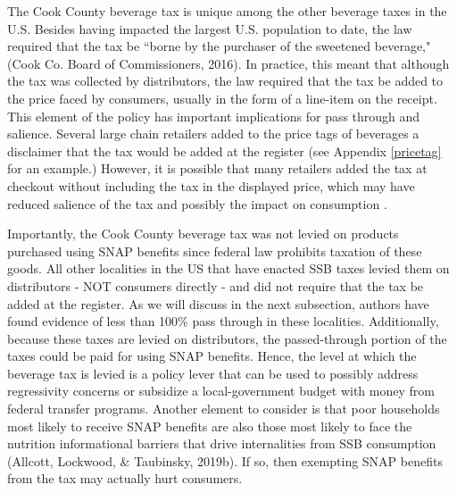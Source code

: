 \documentclass[12pt]{article}
\begin{document}
The Cook County beverage tax is unique among the other beverage taxes in the U.S. Besides having impacted the largest U.S. population to date, the law required that the tax be ``borne by the purchaser of the sweetened beverage," (Cook Co. Board of Commissioners, 2016). In practice, this meant that although the tax was collected by distributors, the law required that the tax be added to the price faced by consumers, usually in the form of a line-item on the receipt. This element of the policy has important implications for pass through and salience. Several large chain retailers added to the price tags of beverages a disclaimer that the tax would be added at the register (see Appendix \ref{pricetag} for an example.) However, it is possible that many retailers added the tax at checkout without including the tax in the displayed price, which may have reduced salience of the tax and possibly the impact on consumption \parencite{chetty2009salience}.

Importantly, the Cook County beverage tax was not levied on products purchased using SNAP benefits since federal law prohibits taxation of these goods. All other localities in the US that have enacted SSB taxes levied them on distributors - NOT consumers directly - and did not require that the tax be added at the register. As we will discuss in the next subsection, authors have found evidence of less than 100\% pass through in these localities. Additionally, because these taxes are levied on distributors, the passed-through portion of the taxes could be paid for using SNAP benefits. Hence, the level at which the beverage tax is levied is a policy lever that can be used to possibly address regressivity concerns or subsidize a local-government budget with money from federal transfer programs. Another element to consider is that poor households most likely to receive SNAP benefits are also those most likely to face the nutrition informational barriers that drive internalities from SSB consumption (Allcott, Lockwood, \& Taubinsky, 2019b). If so, then exempting SNAP benefits from the tax may actually hurt consumers.
\end{document}
